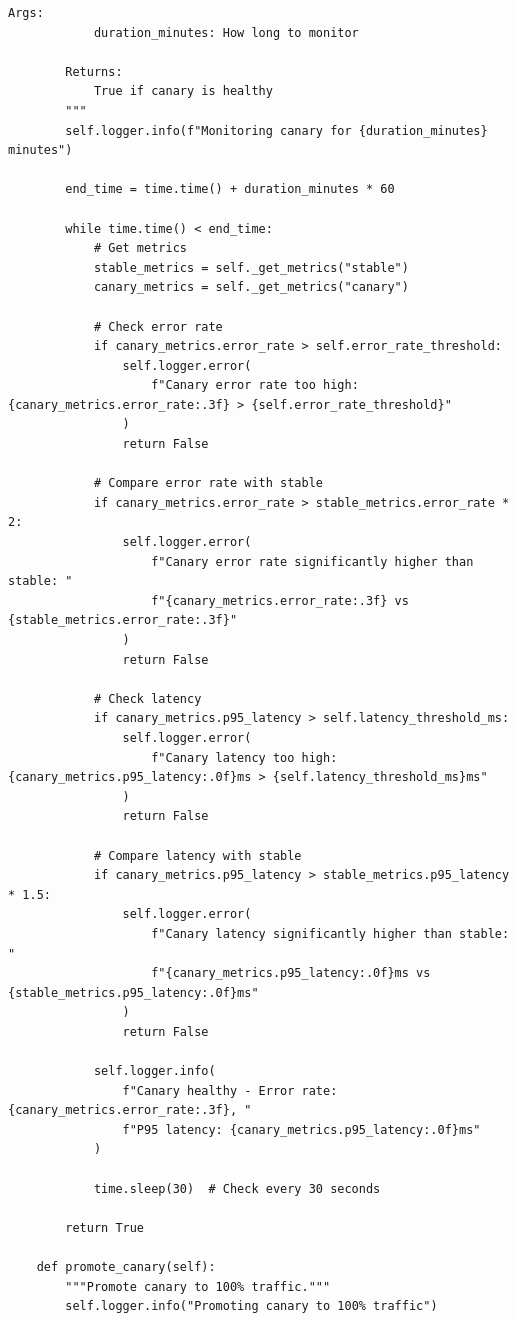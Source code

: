 \begin{lstlisting}[style=python, caption={Canary Deployment Controller}]
        Args:
            duration_minutes: How long to monitor

        Returns:
            True if canary is healthy
        """
        self.logger.info(f"Monitoring canary for {duration_minutes} minutes")

        end_time = time.time() + duration_minutes * 60

        while time.time() < end_time:
            # Get metrics
            stable_metrics = self._get_metrics("stable")
            canary_metrics = self._get_metrics("canary")

            # Check error rate
            if canary_metrics.error_rate > self.error_rate_threshold:
                self.logger.error(
                    f"Canary error rate too high: {canary_metrics.error_rate:.3f} > {self.error_rate_threshold}"
                )
                return False

            # Compare error rate with stable
            if canary_metrics.error_rate > stable_metrics.error_rate * 2:
                self.logger.error(
                    f"Canary error rate significantly higher than stable: "
                    f"{canary_metrics.error_rate:.3f} vs {stable_metrics.error_rate:.3f}"
                )
                return False

            # Check latency
            if canary_metrics.p95_latency > self.latency_threshold_ms:
                self.logger.error(
                    f"Canary latency too high: {canary_metrics.p95_latency:.0f}ms > {self.latency_threshold_ms}ms"
                )
                return False

            # Compare latency with stable
            if canary_metrics.p95_latency > stable_metrics.p95_latency * 1.5:
                self.logger.error(
                    f"Canary latency significantly higher than stable: "
                    f"{canary_metrics.p95_latency:.0f}ms vs {stable_metrics.p95_latency:.0f}ms"
                )
                return False

            self.logger.info(
                f"Canary healthy - Error rate: {canary_metrics.error_rate:.3f}, "
                f"P95 latency: {canary_metrics.p95_latency:.0f}ms"
            )

            time.sleep(30)  # Check every 30 seconds

        return True

    def promote_canary(self):
        """Promote canary to 100% traffic."""
        self.logger.info("Promoting canary to 100% traffic")


\end{lstlisting}
